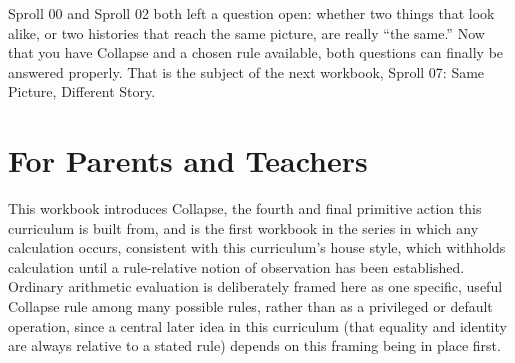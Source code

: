 \documentclass[11pt]{book}
\begin{document}
Sproll 00 and Sproll 02 both left a question open: whether two things that look alike, or two histories that reach the same picture, are really ``the same.'' Now that you have Collapse and a chosen rule available, both questions can finally be answered properly. That is the subject of the next workbook, Sproll 07: Same Picture, Different Story.

\chapter*{For Parents and Teachers}

This workbook introduces Collapse, the fourth and final primitive action this curriculum is built from, and is the first workbook in the series in which any calculation occurs, consistent with this curriculum's house style, which withholds calculation until a rule-relative notion of observation has been established. Ordinary arithmetic evaluation is deliberately framed here as one specific, useful Collapse rule among many possible rules, rather than as a privileged or default operation, since a central later idea in this curriculum (that equality and identity are always relative to a stated rule) depends on this framing being in place first.
\end{document}
